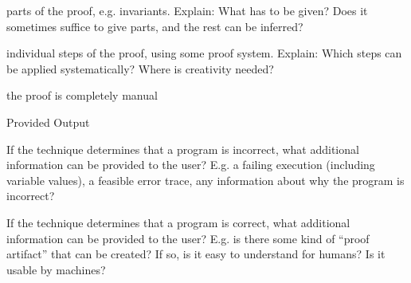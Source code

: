 \documentclass[a4paper]{article}
\begin{document}
\begin{minipage}[t]{0.16\linewidth}
\begin{betterlist}
\begin{betterlist}
			\item \checkboxUnchecked parts of the proof, e.g. invariants. Explain: What has to be given? Does it sometimes suffice to give parts, and the rest can be inferred?

			\item \checkboxUnchecked individual steps of the proof, using some proof system. Explain: Which steps can be applied systematically? Where is creativity needed?

			\item \checkboxUnchecked the proof is completely manual
		\end{betterlist}
		\item \alert{Provided Output}
		\begin{betterlist}
			\item If the technique determines that a program is incorrect, what additional information can be provided to the user? E.g. a failing execution (including variable values), a feasible error trace, any information about why the program is incorrect?

			\item If the technique determines that a program is correct, what additional information can be provided to the user? E.g. is there some kind of \enquote{proof artifact} that can be created? If so, is it easy to understand for humans? Is it usable by machines?


\end{betterlist}
\end{betterlist}
\end{minipage}
\end{document}
